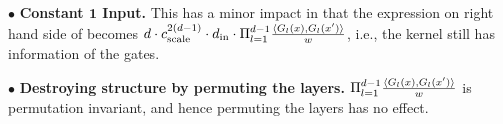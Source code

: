 $\bullet$ \textbf{Constant $\mathbf{1}$ Input.} This has a minor impact in that the expression on right hand side of  becomes $d \cdot c_{\text{scale}}^{2(d-1)} \cdot d_{\text{in}} \cdot \Pi_{l=1}^{d-1} \frac{\langle G_l(x),G_l(x')\rangle}w$, i.e., the kernel still has information of the gates.

$\bullet$ \textbf{Destroying structure by permuting the layers.}  $\Pi_{l=1}^{d-1} \frac{\langle G_l(x),G_l(x')\rangle}w$ is permutation invariant, and hence permuting the layers has no effect.





